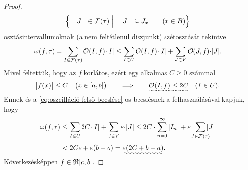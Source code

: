 \documentclass[
]{elteikthesis}[2024/04/26]
\begin{document}
\begin{proof}
\begin{alignat*}{6}
			\Bigl\{ 
				&& & J &\in \mathcal{F}(\tau) \ \Big\vert \ && & J &\subseteq J_x &&\quad (x \in B) 
			\Bigr\}
		\end{alignat*}
		osztásintervallumoknak (a nem feltétlenül diszjunkt) szétosztását tekintve
		\[
			\omega(f, \tau) = 
			\sum_{I \in \mathcal{F}(\tau)} \mathcal{O}(I, f) {\cdot} \abs{I} \leq
			\sum_{I \in U} \mathcal{O}(I, f) {\cdot} \abs{I} + 
			\sum_{J \in V} \mathcal{O}(J, f) {\cdot} \abs{J}.
		\]
		Mivel feltettük, hogy az \( f \) korlátos, ezért egy alkalmas \( C \geq 0 \) számmal%
		\[
			\abs\big{f(x)} \leq C \quad \bigl( x \in [a, b] \bigr)
			\qquad \Longrightarrow \qquad
			\smash{\uwave{\mathcal{O}(I, f) \leq 2C}} \quad (I \in U).
		\]
		Ennek és a \eqref{eq:oszcilláció-felső-becslése}-os becslésnek a felhasználásával kapjuk, hogy
		\begin{align*}
			\omega(f, \tau) &\leq 
			\sum_{I \in U} 2C          {\cdot} \abs{I} + 
			\sum_{J \in V} \varepsilon {\cdot} \abs{J}   \leq
			2C          \cdot \sum_{n=0}^{\infty} \abs{I_n} + 
			\varepsilon \cdot \sum_{\mathclap{J \in \mathcal{F}(\tau)}} \abs{J} \\[3pt] &<
			2C \varepsilon + \varepsilon (b - a) =
			\smash{\uwave{\varepsilon ( 2C + b - a )}}.
		\end{align*}
		Következésképpen \( f \in \mathfrak{R}{[a, b]} \).
	\end{proof}
\end{document}
